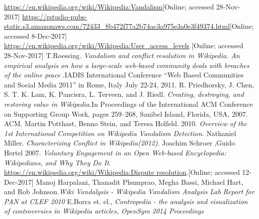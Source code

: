 \documentclass[12pt]{article}
\begin{document}
\begin{thebibliography}{9}
 
 \url{https://en.wikipedia.org/wiki/Wikipedia:Vandalism}[Online; accessed 28-Nov-2017]
 \url{https://rstudio-pubs-static.s3.amazonaws.com/72433_8b472f77a2b74ac3a975e3a0e3f49374.html}[Online; accessed 8-Dec-2017]
\url{https://en.wikipedia.org/wiki/Wikipedia:User_access_levels}
[Online; accessed 28-Nov-2017]
T.Roessing.
\textit{Vandalism and conflict resolution in Wikipedia. An empirical analysis on how a large-scale web-based community deals with breaches of the online peace}
.IADIS International Conference “Web Based Communities and Social Media 2011” in Rome, Italy July 22-24, 2011.
R. Priedhorsky, J. Chen, S. T. K. Lam, K. Panciera, L. Terveen, and J. Riedl.
\textit{Creating, destroying, and restoring value in Wikipedia.}In Proceedings of the International ACM Conference on Supporting Group Work, pages 259–268, Sanibel Island, Florida, USA, 2007. ACM.
Martin Potthast, Benno Stein, and Teresa Holfeld. 2010.
\textit{Overview of the 1st International Competition on Wikipedia Vandalism Detection.}
Nathaniel Miller.
\textit{Characterizing Conflict in Wikipedia(2012)}.
Joachim Schroer ,Guido Hertel 2007.
\textit{Voluntary Engagement in an Open Web-based Encyclopedia: Wikipedians, and Why They Do It}.
\url{https://en.wikipedia.org/wiki/Wikipedia:Dispute resolution}.[Online; accessed 12-Dec-2017]
Manoj Harpalani, Thanadit Phumprao, Megha Bassi, Michael Hart, and Rob Johnson.\textit{Wiki Vandalysis - Wikipedia Vandalism Analysis Lab Report for PAN at CLEF 2010}
E.Borra et. el., \textit{Contropedia - the analysis and visualization of controversies in Wikipedia articles, OpenSym 2014 Proceedings}


\end{thebibliography}
\end{document}
